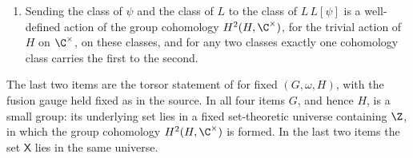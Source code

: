 \begin{lemma}
\begin{enumerate}
              $\omega$. An $L$-symbol $L$ is compatible with $\omega$ if and
              only if $L$ is action-gauge equivalent to $L_0L[\psi]$ for
              some $2$-cocycle $\psi$ on $H$, and $L_0L[\psi_1]$ and
              $L_0L[\psi_2]$ are action-gauge equivalent if and only if
              $\psi_1\sim\psi_2$. Hence sending the class of $\psi$ to the
              class of $L_0L[\psi]$ is a bijection from $H^2(H,\C^\times)$
              onto the action-gauge classes of $L$-symbols compatible with
              $\omega$.
        \item Sending the class of $\psi$ and the class of $L$ to the
              class of $L\,L[\psi]$ is a well-defined action of the group
              cohomology $H^2(H,\C^\times)$, for the trivial action of $H$
              on $\C^\times$, on these classes, and for any two classes
              exactly one cohomology class carries the first to the second.
    \end{enumerate}
    The last two items are the torsor statement of \cite{GarreRubio2023MPOSym}
    for fixed $(G,\omega,H)$, with the fusion gauge held fixed as in the
    source. In all four items $G$, and hence $H$, is a small group: its
    underlying set lies in a fixed set-theoretic universe containing $\Z$,
    in which the group cohomology $H^2(H,\C^\times)$ is formed. In the last
    two items the set $\mathsf X$ lies in the same universe.
\end{lemma}


